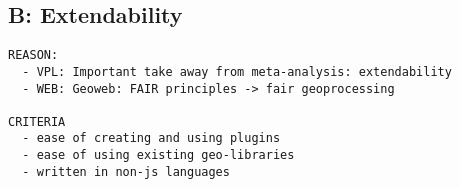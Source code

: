 







\subsection*{B: Extendability}
\begin{lstlisting}
REASON: 
  - VPL: Important take away from meta-analysis: extendability
  - WEB: Geoweb: FAIR principles -> fair geoprocessing

CRITERIA
  - ease of creating and using plugins 
  - ease of using existing geo-libraries 
  - written in non-js languages
\end{lstlisting}




